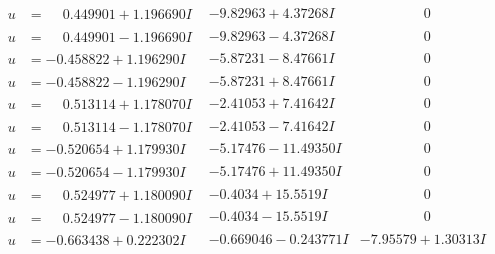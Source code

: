 \documentclass[1p]{elsarticle_modified}
\theoremstyle{definition}
\begin{document}
$$\begin{array}{c|c|c}
\begin{aligned}
u &= \phantom{-}0.449901 + 1.196690 I\end{aligned}
 & -9.82963 + 4.37268 I & \phantom{-0.000000 } 0 \\ \hline\begin{aligned}
u &= \phantom{-}0.449901 - 1.196690 I\end{aligned}
 & -9.82963 - 4.37268 I & \phantom{-0.000000 } 0 \\ \hline\begin{aligned}
u &= -0.458822 + 1.196290 I\end{aligned}
 & -5.87231 - 8.47661 I & \phantom{-0.000000 } 0 \\ \hline\begin{aligned}
u &= -0.458822 - 1.196290 I\end{aligned}
 & -5.87231 + 8.47661 I & \phantom{-0.000000 } 0 \\ \hline\begin{aligned}
u &= \phantom{-}0.513114 + 1.178070 I\end{aligned}
 & -2.41053 + 7.41642 I & \phantom{-0.000000 } 0 \\ \hline\begin{aligned}
u &= \phantom{-}0.513114 - 1.178070 I\end{aligned}
 & -2.41053 - 7.41642 I & \phantom{-0.000000 } 0 \\ \hline\begin{aligned}
u &= -0.520654 + 1.179930 I\end{aligned}
 & -5.17476 - 11.49350 I & \phantom{-0.000000 } 0 \\ \hline\begin{aligned}
u &= -0.520654 - 1.179930 I\end{aligned}
 & -5.17476 + 11.49350 I & \phantom{-0.000000 } 0 \\ \hline\begin{aligned}
u &= \phantom{-}0.524977 + 1.180090 I\end{aligned}
 & -0.4034 + 15.5519 I & \phantom{-0.000000 } 0 \\ \hline\begin{aligned}
u &= \phantom{-}0.524977 - 1.180090 I\end{aligned}
 & -0.4034 - 15.5519 I & \phantom{-0.000000 } 0 \\ \hline\begin{aligned}
u &= -0.663438 + 0.222302 I\end{aligned}
 & -0.669046 - 0.243771 I & -7.95579 + 1.30313 I \\ \hline\begin{aligned}

\end{aligned}
\end{array}$$
\end{document}
